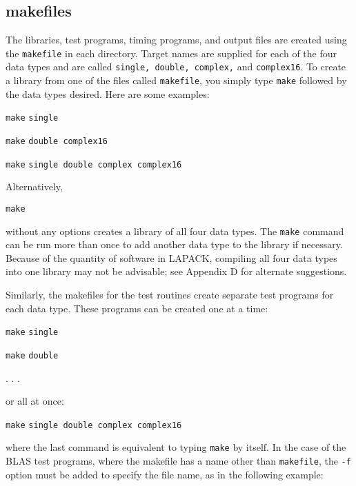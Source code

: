 \subsection{makefiles}

\hspace{\parindent}
The libraries, test programs, timing programs, and output files
are created using the {\tt makefile} in each directory.  
Target names are supplied for each of the
four data types and are called {\tt single, double, complex,} and
{\tt complex16}.
To create a library from one of the files called {\tt makefile}, 
you simply type {\tt make} followed by the data types desired.
Here are some examples:

\begin{list}{}{}
\item{{\tt make}} {\tt single}
\item{{\tt make}} {\tt double complex16}
\item{{\tt make}} {\tt single double complex complex16}
\end{list}

\noindent
Alternatively,
\begin{list}{}{}
\item{{\tt make}}
\end{list}
without any options creates a library of all four data types.  
The {\tt make} command can be run more than once to add
another data type to the library if necessary.
Because of the quantity of software in LAPACK, compiling all
four data types into one library may not be advisable; see
Appendix D for alternate suggestions.

Similarly, the makefiles for the test routines create
separate test programs for each data type.
These programs can be created one at a time:

\begin{list}{}{}
\item{{\tt make}} {\tt single}
\item{{\tt make}} {\tt double}
\item{ . . . }
\end{list}

\noindent
or all at once:
\begin{list}{}{}
\item{{\tt make}} {\tt single double complex complex16}
\end{list}
where the last command is equivalent to typing {\tt make} 
by itself.  In the case of the BLAS test programs, where
the makefile has a name other than {\tt makefile},
the {\tt -f} option must be added to specify the file name,
as in the following example:

